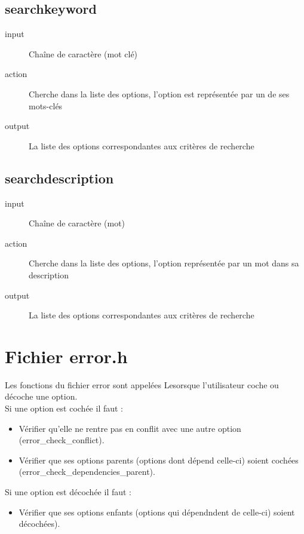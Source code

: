 \documentclass[16pts]{report}
\begin{document}
\section{search\textunderscore keyword}
\label{sec:search keyword}
\begin{description}
    \item[input] Chaîne de caractère (mot clé)
    \item[action] Cherche dans la liste des options, l’option est représentée par un de ses mots-clés
    \item[output] La liste des options correspondantes aux critères de recherche
\end{description}

\section{search\textunderscore description}
\label{sec:search description}
\begin{description}
    \item[input] Chaîne de caractère (mot)
    \item[action] Cherche dans la liste des options, l’option représentée par un mot dans sa description
    \item[output] La liste des options correspondantes aux critères de recherche
\end{description}


\chapter{Fichier error.h}
\label{cha:Fichier error.h}
Les fonctions du fichier error sont appelées Lesorsque l’utilisateur coche ou
décoche une option. \\
Si une option est cochée il faut :
\begin{itemize}
    \item Vérifier qu’elle ne rentre pas en conflit avec une autre option
        (error\_check\_conflict).
    \item Vérifier que ses options parents (options dont dépend celle-ci)
        soient cochées (error\_check\_dependencies\_parent).
\end{itemize}

Si une option est décochée il faut :
\begin{itemize}
    \item Vérifier que ses options enfants (options qui dépendndent de
        celle-ci) soient décochées).
\end{itemize}
\end{document}
